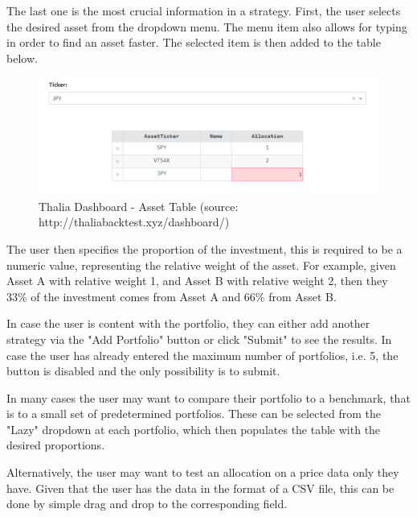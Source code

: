 \documentclass[main.tex]{subfiles}
\begin{document}
The last one is the most crucial information in a strategy. First, the user selects the desired asset from the dropdown menu. The menu item also allows for typing in order to find an asset faster. The selected item is then added to the table below.



\begin{figure}[H]

   \centering

   \includegraphics[width=\textwidth]{08Appendices/081User/081Pictures/table.png}

   \caption{Thalia Dashboard - Asset Table (source: http://thaliabacktest.xyz/dashboard/)}

   \label{thalia_table}

\end{figure}



The user then specifies the proportion of the investment, this is required to be a numeric value, representing the relative weight of the asset. For example, given Asset A with relative weight 1, and Asset B with relative weight 2, then they 33\% of the investment comes from Asset A and 66\% from Asset B.

In case the user is content with the portfolio, they can either add another strategy via the "Add Portfolio" button or click "Submit" to see the results. In case the user has already entered the maximum number of portfolios, i.e. 5, the button is disabled and the only possibility is to submit.



In many cases the user may want to compare their portfolio to a benchmark, that is to a small set of predetermined portfolios. These can be selected from the "Lazy" dropdown at each portfolio, which then populates the table with the desired proportions.

Alternatively, the user may want to test an allocation on a price data only they have. Given that the user has the data in the format of a CSV file, this can be done by simple drag and drop to the corresponding field. 
\end{document}

